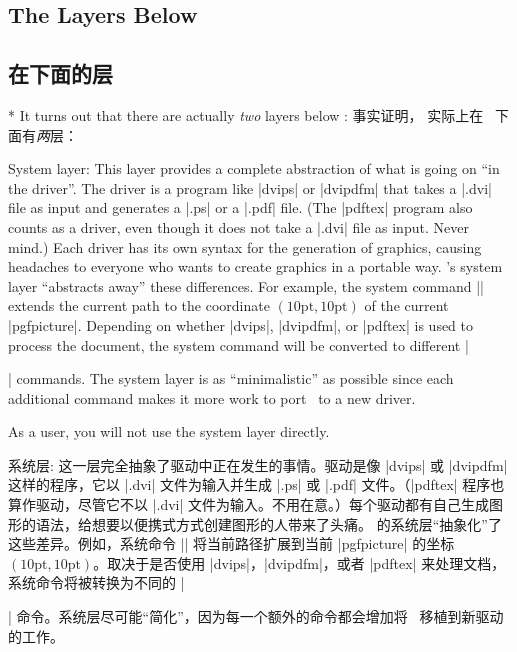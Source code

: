 \begin{paracol}{2}
\subsection{The Layers Below \tikzname}
\switchcolumn
\subsection{在\tikzname{}下面的层}
\switchcolumn[0]*%
It turns out that there are actually \emph{two} layers below \tikzname:
\switchcolumn
事实证明，
实际上在 \tikzname\ 下面有\emph{两}层：
\end{paracol}
\begin{description}
\begin{paracol}{2}
    \item[System layer:] This layer provides a complete abstraction of what
        is going on ``in the driver''. The driver is a program like |dvips|
        or |dvipdfm| that takes a |.dvi| file as input and generates a |.ps|
        or a |.pdf| file. (The |pdftex| program also counts as a driver, even
        though it does not take a |.dvi| file as input. Never mind.) Each
        driver has its own syntax for the generation of graphics, causing
        headaches to everyone who wants to create graphics in a portable way.
        \pgfname's system layer ``abstracts away'' these differences. For
        example, the system command |\pgfsys@lineto{10pt}{10pt}| extends the
        current path  to the coordinate $(10\mathrm{pt},10\mathrm{pt})$ of
        the current |{pgfpicture}|. Depending on whether |dvips|, |dvipdfm|,
        or |pdftex| is used to process the document, the system command will
        be converted to different |\special| commands. The system layer is as
        ``minimalistic'' as possible since each additional command makes it
        more work to port \pgfname\ to a new driver.


        As a user, you will not use the system layer directly.
\switchcolumn
    \item[系统层:]
            这一层完全抽象了驱动中正在发生的事情。驱动是像 |dvips| 或 |dvipdfm| 这样的程序，它以 |.dvi| 文件为输入并生成 |.ps| 或 |.pdf| 文件。（|pdftex| 程序也算作驱动，尽管它不以 |.dvi| 文件为输入。不用在意。）每个驱动都有自己生成图形的语法，给想要以便携式方式创建图形的人带来了头痛。 \pgfname 的系统层“抽象化”了这些差异。例如，系统命令 |\pgfsys@lineto{10pt}{10pt}| 将当前路径扩展到当前 |{pgfpicture}| 的坐标 $(10\mathrm{pt},10\mathrm{pt})$。取决于是否使用 |dvips|，|dvipdfm|，或者 |pdftex| 来处理文档，系统命令将被转换为不同的 |\special| 命令。系统层尽可能“简化”，因为每一个额外的命令都会增加将 \pgfname\ 移植到新驱动的工作。


\end{paracol}
\end{description}
